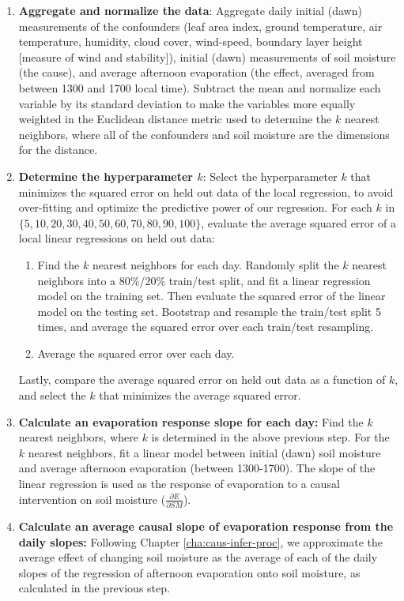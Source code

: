 \begin{enumerate}
\item \textbf{Aggregate and normalize the data}: Aggregate daily
  initial (dawn) measurements of the confounders (leaf area index,
  ground temperature, air temperature, humidity, cloud cover,
  wind-speed, boundary layer height [measure of wind and stability]),
  initial (dawn) measurements of soil moisture (the cause), and
  average afternoon evaporation (the effect, averaged from between
  1300 and 1700 local time). Subtract the mean and normalize each
  variable by its standard deviation to make the variables more
  equally weighted in the Euclidean distance metric used to determine
  the $k$ nearest neighbors, where all of the confounders and soil
  moisture are the dimensions for the distance.
  \item \textbf{Determine the hyperparameter $k$}: Select the
    hyperparameter $k$ that minimizes the squared error on held out
    data of the local regression, to avoid over-fitting and optimize
    the predictive power of our regression. For each $k$ in $\{5, 10,
    20, 30, 40, 50, 60, 70, 80, 90, 100\}$, evaluate the average
    squared error of a local linear regressions on held out data:
    \begin{enumerate}
    \item{Find the $k$ nearest neighbors for each day. Randomly split
      the $k$ nearest neighbors into a 80\%/20\% train/test split, and
      fit a linear regression model on the training set. Then evaluate
      the squared error of the linear model on the testing
      set. Bootstrap and resample the train/test split 5 times, and
      average the squared error over each train/test
      resampling.}
    \item{Average the squared error over each day.}
    \end{enumerate}
    Lastly, compare the average squared error on held out data as a function
    of $k$, and select the $k$ that minimizes the average squared error.
  \item \textbf{Calculate an evaporation response slope for each day:}
    Find the $k$ nearest neighbors, where $k$ is determined in the
    above previous step. For the $k$ nearest neighbors, fit a linear
    model between initial (dawn) soil moisture and average afternoon
    evaporation (between 1300-1700). The slope of the linear
    regression is used as the response of evaporation to a causal
    intervention on soil moisture ($\frac{\partial E}{\partial SM}$).
  \item \textbf{Calculate an average causal slope of evaporation
    response from the daily slopes:} Following
    Chapter \ref{cha:caus-infer-proc}, we approximate the average
    effect of changing soil moisture as the average of each of the
    daily slopes of the regression of afternoon evaporation onto soil
    moisture, as calculated in the previous step.
\end{enumerate}


